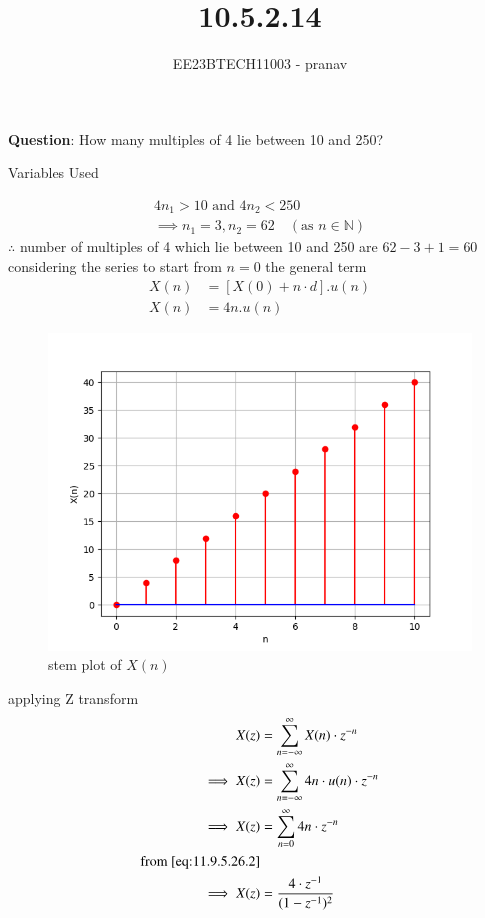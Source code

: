\documentclass[journal,12pt,twocolumn]{IEEEtran}
\theoremstyle{remark}
\begin{document}

\vspace{3cm}

\title{10.5.2.14}
\author{EE23BTECH11003 - pranav}
\maketitle
\newpage

\bigskip
\renewcommand{\thefigure}{\arabic{figure}}
\renewcommand{\thetable}{\arabic{table}}

\textbf{Question}:
How many multiples of 4 lie between 10 and 250?\\
\solution
\begin{table}[h]
    \centering
    
    \caption{Variables Used}
    \label{tab:table_11.9.3.6}
\end{table}
\begin{align}
     4n_{1}>10   \text{ and }  4n_{2}<250  \\
\implies n_{1}=3,n_{2}=62  \quad (\text{as }  n \in \mathbb{N})
\end{align}
 $\therefore$ number of multiples of 4 which lie between  10 and 250 are $62-3+1=60$ \\
considering the series to start from $n=0$ the general term
\begin{align}
X(n)&=[X(0)+n\cdot d].u(n)\\
X(n)&=4n.u(n)
\end{align}
\begin{figure}[h!]
    \centering
    \includegraphics[width=1.1\linewidth]{figs/graph1.png}
    \caption{stem plot of $X(n)$}
\end{figure}

applying Z transform
\begin{align}
    X(z)&= \sum_{n=-\infty}^{\infty}X(n)\cdot z^{-n}\\
   \implies X(z)&= \sum_{n=-\infty}^{\infty} 4n\cdot u(n)\cdot z^{-n}\\
   \implies X(z) &=\sum_{n= 0}^{\infty} 4n \cdot z^{-n}\\
   \text{from } \ref{eq:11.9.5.26.2}\\
   \implies X(z)&=\frac{4\cdot z^{-1}}{(1-z^{-1})^{2}}
\end{align}
\end{document}
